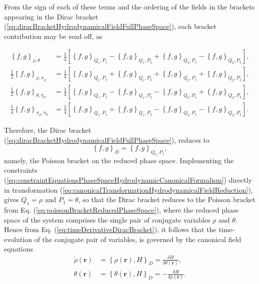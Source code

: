 \documentclass[twocolumn, nofootinbib, nobibnotes, amsmath,amssymb,aps, pra, floatfix]{revtex4-1}
\renewcommand{\v}[1]{\ensuremath{\mathbf{#1}}} %
\begin{document}
From the sign of each of these terms and the ordering of the fields in the brackets appearing in the Dirac bracket (\ref{eq:diracBracketHydrodynamicalFieldFullPhaseSpace}), each bracket contribution may be read off, as
\begin{widetext}
\begin{align}
  \left\{ f,g \right\}_{\rho,\theta}&=\frac{1}{4}\left[ \left\{ f,g \right\}_{Q_1,P_1}-\left\{ f,g \right\}_{Q_1,P_2}+\left\{ f,g \right\}_{Q_2,P_1}-\left\{ f,g \right\}_{Q_2,P_2} \right],\\
  \frac{1}{2}\left\{ f,g \right\}_{\rho,\pi_{\rho}}&=\frac{1}{4}\left[ \left\{ f,g \right\}_{Q_1,P_1}+\left\{ f,g \right\}_{Q_1,P_2}+\left\{ f,g \right\}_{Q_2,P_1}+\left\{ f,g \right\}_{Q_2,P_2} \right], \\
  \frac{1}{2}\left\{ f,g \right\}_{\theta,\pi_{\theta}}&=\frac{1}{4}\left[ \left\{ f,g \right\}_{Q_1,P_1}-\left\{ f,g \right\}_{Q_1,P_2}-\left\{ f,g \right\}_{Q_2,P_1}+\left\{ f,g \right\}_{Q_2,P_2} \right], \\
  \frac{1}{4}\left\{ f,g \right\}_{\pi_{\rho},\pi_{\theta}}&=\frac{1}{4}\left[ \left\{ f,g \right\}_{Q_1,P_1}+\left\{ f,g \right\}_{Q_1,P_2}-\left\{ f,g \right\}_{Q_2,P_1}-\left\{ f,g \right\}_{Q_2,P_2} \right].
  \label{}
\end{align}
\end{widetext}
Therefore, the Dirac bracket (\ref{eq:diracBracketHydrodynamicalFieldFullPhaseSpace}), reduces to
\begin{equation}
  \left\{ f,g \right\}_D=\left\{ f,g \right\}_{Q_1,P_1},
  \label{}
\end{equation}
namely, the Poisson bracket on the reduced phase space.
Implementing the constraints (\ref{eq:constraintEquationsPhaseSpaceHydrodynamicCanonicalFormalism}) directly in transformation (\ref{eq:canonicalTransformationHydrodynamicalFieldReduction}), gives $Q_1=\rho$ and $P_1=\theta$, so that the Dirac bracket reduces to the Poisson bracket from Eq. (\ref{eq:poissonBracketReducedPhaseSpace}), where the reduced phase space of the system comprises the single pair of conjugate variables $\rho$ and $\theta$.
Hence from Eq. (\ref{eq:timeDerivativeDiracBracket}), it follows that the time-evolution of the conjugate pair of variables, is governed by the canonical field equations
\begin{align}
  \dot{\rho}\left( \v{r} \right)&=\left\{ \rho\left( \v{r} \right),H \right\}_D=\frac{\delta H}{\delta\theta\left( \v{r} \right)}, \label{eq:canonicalHydrodynamicalFieldEquations1} \\
  \dot{\theta}\left( \v{r} \right)&=\left\{ \theta\left( \v{r} \right),H \right\}_D=-\frac{\delta H}{\delta\rho\left( \v{r} \right)}.
  \label{eq:canonicalHydrodynamicalFieldEquations2}
\end{align}
\end{document}
